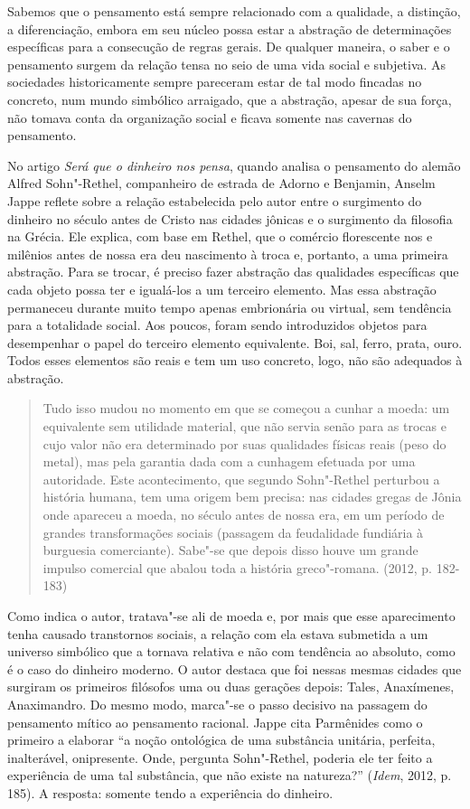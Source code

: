 Sabemos que o pensamento está sempre relacionado com a qualidade, a
distinção, a diferenciação, embora em seu núcleo possa estar a abstração
de determinações específicas para a consecução de regras gerais. De
qualquer maneira, o saber e o pensamento surgem da relação tensa no seio
de uma vida social e subjetiva. As sociedades historicamente sempre
pareceram estar de tal modo fincadas no concreto, num mundo simbólico
arraigado, que a abstração, apesar de sua força, não tomava conta da
organização social e ficava somente nas cavernas do pensamento.

No artigo \emph{Será que o dinheiro nos pensa}, quando analisa o
pensamento do alemão Alfred Sohn"-Rethel, companheiro de estrada de
Adorno e Benjamin, Anselm Jappe reflete sobre a relação estabelecida
pelo autor entre o surgimento do dinheiro no século  antes de Cristo
nas cidades jônicas e o surgimento da filosofia na Grécia. Ele explica,
com base em Rethel, que o comércio florescente nos  e  milênios
antes de nossa era deu nascimento à troca e, portanto, a uma primeira
abstração. Para se trocar, é preciso fazer abstração das qualidades
específicas que cada objeto possa ter e igualá-los a um terceiro
elemento. Mas essa abstração permaneceu durante muito tempo apenas
embrionária ou virtual, sem tendência para a totalidade social. Aos
poucos, foram sendo introduzidos objetos para desempenhar o papel do
terceiro elemento equivalente. Boi, sal, ferro, prata, ouro. Todos esses
elementos são reais e tem um uso concreto, logo, não são adequados à
abstração.

\begin{quote}
Tudo isso mudou no momento em que se começou a cunhar a moeda: um
equivalente sem utilidade material, que não servia senão para as trocas
e cujo valor não era determinado por suas qualidades físicas reais (peso
do metal), mas pela garantia dada com a cunhagem efetuada por uma
autoridade. Este acontecimento, que segundo Sohn"-Rethel perturbou a
história humana, tem uma origem bem precisa: nas cidades gregas de Jônia
onde apareceu a moeda, no século  antes de nossa era, em um período
de grandes transformações sociais (passagem da feudalidade fundiária à
burguesia comerciante). Sabe"-se que depois disso houve um grande impulso
comercial que abalou toda a história greco"-romana. (2012, p. 182-183)
\end{quote}

Como indica o autor, tratava"-se ali de moeda e, por mais que esse
aparecimento tenha causado transtornos sociais, a relação com ela estava
submetida a um universo simbólico que a tornava relativa e não com
tendência ao absoluto, como é o caso do dinheiro moderno. O autor
destaca que foi nessas mesmas cidades que surgiram os primeiros
filósofos uma ou duas gerações depois: Tales, Anaxímenes, Anaximandro.
Do mesmo modo, marca"-se o passo decisivo na passagem do pensamento
mítico ao pensamento racional. Jappe cita Parmênides como o primeiro a
elaborar ``a noção ontológica de uma substância unitária, perfeita,
inalterável, onipresente. Onde, pergunta Sohn"-Rethel, poderia ele ter
feito a experiência de uma tal substância, que não existe na natureza?''
(\emph{Idem}, 2012, p. 185). A resposta: somente tendo a experiência do
dinheiro.

